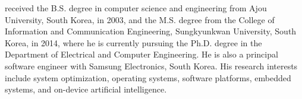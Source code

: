 received the B.S. degree in computer science and engineering from Ajou
University, South Korea, in 2003, and the M.S. degree from the College of
Information and Communication Engineering, Sungkyunkwan University, South Korea,
in 2014, where he is currently pursuing the Ph.D. degree in the Department of
Electrical and Computer Engineering. He is also a principal software engineer
with Samsung Electronics, South Korea. His research interests include system
optimization, operating systems, software platforms, embedded systems, and
on-device artificial intelligence.
